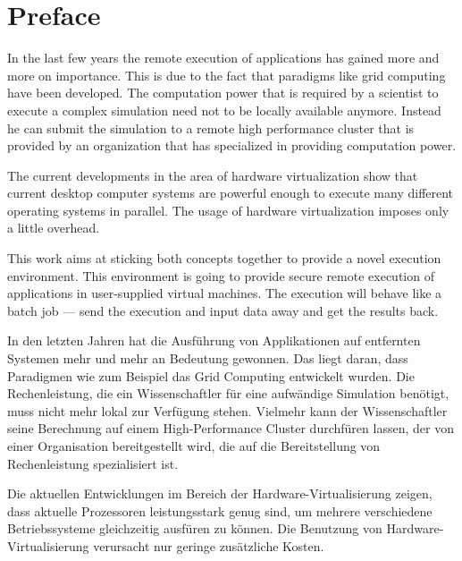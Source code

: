 
\chapter{Preface}
\thispagestyle{empty}

In the last few years the remote execution of applications has gained more
and more on  importance. This is due to the fact  that paradigms like grid
computing have been developed. The computation power that is required by a
scientist to execute a complex simulation need not to be locally available
anymore.   Instead  he  can  submit   the  simulation  to  a  remote  high
performance  cluster  that  is   provided  by  an  organization  that  has
specialized in providing computation power.

The current developments in the  area of hardware virtualization show that
current  desktop computer  systems  are powerful  enough  to execute  many
different   operating  systems   in  parallel.   The  usage   of  hardware
virtualization imposes only a little overhead.

This  work aims  at sticking  both concepts  together to  provide  a novel
execution environment.  This environment is going to provide secure remote
execution  of   applications  in  user-supplied   virtual  machines.   The
execution will  behave like a batch  job --- send the  execution and input
data away and get the results back.

\vfill

In  den  letzten  Jahren  hat  die Ausf\"{u}hrung  von  Applikationen  auf
entfernten Systemen mehr und mehr  an Bedeutung gewonnen. Das liegt daran,
dass Paradigmen wie zum Beispiel das Grid Computing entwickelt wurden. Die
Rechenleistung,  die  ein   Wissenschaftler  f\"{u}r  eine  aufw\"{a}ndige
Simulation ben\"{o}tigt,  muss nicht mehr lokal  zur Verf\"{u}gung stehen.
Vielmehr   kann   der   Wissenschaftler   seine   Berechnung   auf   einem
High-Performance Cluster durchf\"{u}ren lassen, der von einer Organisation
bereitgestellt  wird,  die   auf  die  Bereitstellung  von  Rechenleistung
spezialisiert ist.

Die  aktuellen  Entwicklungen   im  Bereich  der  Hardware-Virtualisierung
zeigen, dass  aktuelle Prozessoren  leistungsstark genug sind,  um mehrere
verschiedene Betriebssysteme gleichzeitig  ausf\"{u}ren zu k\"{o}nnen. Die
Benutzung    von   Hardware-Virtualisierung    verursacht    nur   geringe
zus\"{a}tzliche Kosten.

